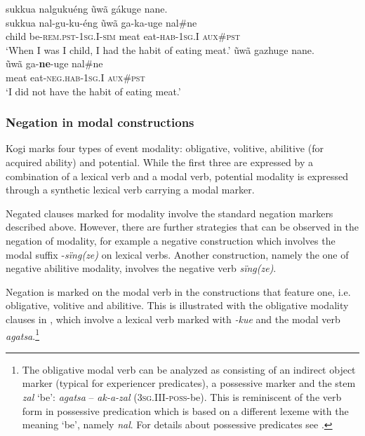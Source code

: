 \documentclass[output=paper,colorlinks,citecolor=brown]{langscibook}
\begin{document}
\ea\label{ex:kog:16}
    \ea\label{ex:kog:16a}sukkua nalgukuéng ũwã gákuge nane.\\
        \gll  sukkua nal{}-gu{}-ku-éng ũwã  ga{}-ka-uge nal\#ne\\ 
              child be-\textsc{rem.pst-1sg.I{}-sim} meat eat-\textsc{hab-1sg.I} \textsc{aux}\#\textsc{pst}\\
        \glt ‘When I was I child, I had the habit of eating meat.’
    \ex\label{ex:kog:16b}ũwã gazhuge nane.\\
        \gll  ũwã ga-\textbf{ne}-uge nal\#ne\\
              meat eat-\textsc{neg.hab-1sg.I} \textsc{aux}\#\textsc{pst}\\
        \glt ‘I did not have the habit of eating meat.’
    \z
\z 

\subsubsection{Negation in modal constructions}\label{sec:kog:2.1.4}

Kogi marks four types of event modality: obligative, volitive, abilitive (for acquired ability) and potential. While the first three are expressed by a combination of a lexical verb and a modal verb, potential modality is expressed through a synthetic lexical verb carrying a modal marker.

Negated clauses marked for modality involve the standard negation markers described above. However, there are further strategies that can be observed in the negation of modality, for example a negative construction which involves the modal suffix -\textit{sïng(ze)} on lexical verbs. Another construction, namely the one of negative abilitive modality, involves the negative verb \textit{sïng(ze)}.

Negation is marked on the modal verb in the constructions that feature one, i.e. obligative, volitive and abilitive. This is illustrated with the obligative modality clauses in , which involve a lexical verb marked with \textit{{}-kue} and the modal verb \textit{agatsa}.\footnote{The obligative modal verb can be analyzed as consisting of an indirect object marker (typical for experiencer predicates), a possessive marker and the stem \textit{zal} ‘be’: \textit{agatsa} – \textit{ak-a-zal} (\textsc{3sg.III{}-poss}{}-be). This is reminiscent of the verb form in possessive predication which is based on a different lexeme with the meaning ‘be’, namely \textit{nal}. For details about possessive predicates see .}
\end{document}
